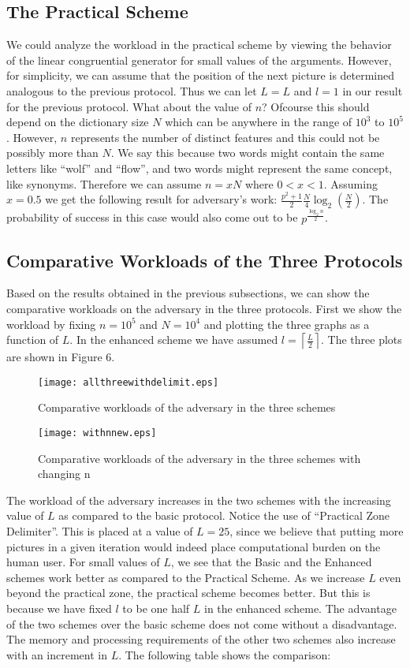 \documentclass{llncs}
\begin{document}
\subsection{The Practical Scheme}
We could analyze the workload in the practical scheme by viewing the behavior of the linear congruential generator for small values of the arguments. However, for simplicity, we can assume that the position of the next picture is determined analogous to the previous protocol. Thus we can let $L=L$ and $l=1$ in our result for the previous protocol. What about the value of $n$? Ofcourse this should depend on the dictionary size $N$ which can be anywhere in the range of $10^3$ to $10^5$. However, $n$ represents the number of distinct features and this could not be possibly more than $N$. We say this because two words might contain the same letters like ``wolf'' and ``flow'', and two words might represent the same concept, like synonyms. Therefore we can assume $n = xN$ where $0 < x < 1$. Assuming $x=0.5$ we get the following result for adversary's work: $\frac{{p^2  + 1}}{2}\frac{N}{4}\log _2 \left( {\frac{N}{2}} \right)$. The probability of success in this case would also come out to be $p^{\frac{{\log _2 n}}{2}} $.
\subsection{Comparative Workloads of the Three Protocols}
Based on the results obtained in the previous subsections, we can show the comparative workloads on the adversary in the three protocols. First we show the workload by fixing $n = 10^5 $ and $N = 10^4 $ and plotting the three graphs as a function of $L$. In the enhanced scheme we have assumed $l = \left\lceil {\frac{L}{2}} \right\rceil $. The three plots are shown in Figure 6.
\begin{figure}[ht]
\centerline{\texttt{[image: allthreewithdelimit.eps]}}
\caption{Comparative workloads of the adversary in the three schemes}
\label{fig2}
\end{figure}


\begin{figure}[ht]
\centerline{\texttt{[image: withnnew.eps]}}
\caption{Comparative workloads of the adversary in the three schemes with changing n}
\label{fig3}
\end{figure}


The workload of the adversary increases in the two schemes with the increasing value of $L$ as compared to the basic protocol. Notice the use of ``Practical Zone Delimiter''. This is placed at a value of $L=25$, since we believe that putting more pictures in a given iteration would indeed place computational burden on the human user. For small values of $L$, we see that the Basic and the Enhanced schemes work better as compared to the Practical Scheme. As we increase $L$ even beyond the practical zone, the practical scheme becomes better. But this is because we have fixed $l$ to be one half $L$ in the enhanced scheme. The advantage of the two schemes over the basic scheme does not come without a disadvantage. The memory and processing requirements of the other two schemes also increase with an increment in $L$. The following table shows the comparison:
\end{document}
